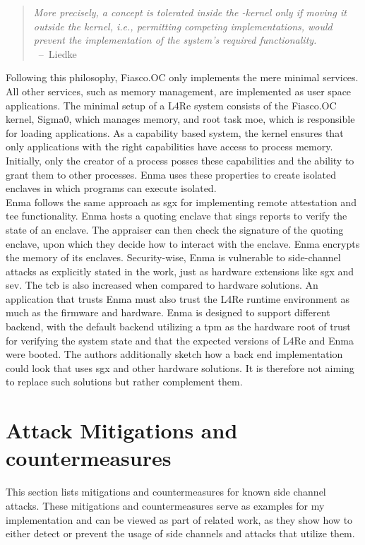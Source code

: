 \begin{quote}
  \textit{ More precisely, a concept is tolerated inside the \mu-kernel only
    if moving it outside the kernel, i.e., permitting competing
    implementations, would prevent the implementation of the system's
    required functionality. \\
  } \mbox{ -- Liedke~\cite{liedtke1995micro}}
\end{quote}

Following this philosophy, Fiasco.OC only implements the mere minimal services.
All other services, such as memory management, are implemented as user space
applications. The minimal setup of a L4Re system consists of the Fiasco.OC
kernel, Sigma0, which manages memory, and root task moe, which is responsible
for loading applications. As a capability based system, the kernel ensures that
only applications with the right capabilities have access to process memory.
Initially, only the creator of a process posses these capabilities and the
ability to grant them to other processes. Enma uses these properties to create
isolated enclaves in which programs can execute isolated.\\

Enma follows the same approach as \gls{sgx} for implementing remote attestation
and \gls{tee} functionality. Enma hosts a quoting enclave that sings reports to
verify the state of an enclave. The appraiser can then check the signature of
the quoting enclave, upon which they decide how to interact with the enclave.
Enma encrypts the memory of its enclaves. Security-wise, Enma is vulnerable to
side-channel attacks as explicitly stated in the work, just as hardware
extensions like \gls{sgx} and \gls{sev}. The \gls{tcb} is also increased when
compared to hardware solutions. An application that trusts Enma must also trust
the L4Re runtime environment as much as the firmware and hardware. Enma is
designed to support different backend, with the default backend utilizing a
\gls{tpm} as the hardware root of trust for verifying the system state and that
the expected versions of L4Re and Enma were booted. The authors additionally
sketch how a back end implementation could look that uses \gls{sgx} and other
hardware solutions. It is therefore not aiming to replace such solutions but
rather complement them.

\section{Attack Mitigations and countermeasures}
\label{sec:20:mitigations}
This section lists mitigations and countermeasures for known side channel
attacks. These mitigations and countermeasures serve as examples for my
implementation and can be viewed as part of related work, as they show how to
either detect or prevent the usage of side channels and attacks that utilize
them.

